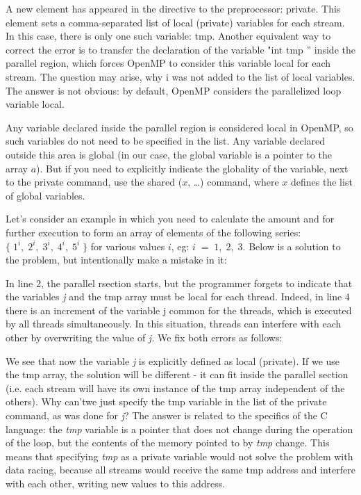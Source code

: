 {	\begin{figure}[H]
		
	\end{figure}
	\par A new element has appeared in the directive to the preprocessor: private. This element sets a comma-separated list of local (private) variables for each stream. In this case, there is only one such variable: tmp. Another equivalent way to correct the error is to transfer the declaration of the variable "int tmp '' inside the parallel region, which forces OpenMP to consider this variable local for each stream. The question may arise, why i was not added to the list of local variables. The answer is not obvious: by default, OpenMP considers the parallelized loop variable local.
	\par Any variable declared inside the parallel region is considered local in OpenMP, so such variables do not need to be specified in the list. Any variable declared outside this area is global (in our case, the global variable is a pointer to the array $a$). But if you need to explicitly indicate the globality of the variable, next to the private command, use the shared ($x$, \ldots) command, where $x$ defines the list of global variables.
	\par Let's consider an example in which you need to calculate the amount and for further execution to form an array of elements of the following series: $\{\;1^i,\;2^i,\;3^i,\;4^i,\;5^i\;\}$ for various values $i$, eg: $i\;=\;1,\;2,\;3$. Below is a solution to the problem, but intentionally make a mistake in it:
	\begin{figure}[H]
		
	\end{figure}
	\par In line 2, the parallel rsection starts, but the programmer forgets to indicate that the variables\textit{ j} and the tmp array must be local for each thread. Indeed, in line 4 there is an increment of the variable j common for the threads, which is executed by all threads simultaneously. In this situation, threads can interfere with each other by overwriting the value of\textit{ j.} We fix both errors as follows:
	\begin{figure}[H]
		
	\end{figure}
	\par We see that now the variable \textit{j} is explicitly defined as local (private). If we use the tmp array, the solution will be different - it can fit inside the parallel section (i.e. each stream will have its own instance of the tmp array independent of the others). Why can'twe just specify the tmp variable in the list of the private command, as was done for \textit{j}? The answer is related to the specifics of the C language: the \textit{tmp} variable is a pointer that does not change during the operation of the loop, but the contents of the memory pointed to by \textit{tmp }change. This means that specifying \textit{tmp} as a private variable would not solve the problem with data racing, because all streams would receive the same tmp address and interfere with each other, writing new values to this address.
}
